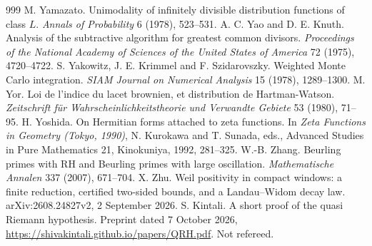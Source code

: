 \begin{thebibliography}{999}
 M. Yamazato. Unimodality of infinitely divisible distribution functions of class $L$. \emph{Annals of Probability} 6 (1978), 523--531.
 A. C. Yao and D. E. Knuth. Analysis of the subtractive algorithm for greatest common divisors. \emph{Proceedings of the National Academy of Sciences of the United States of America} 72 (1975), 4720--4722.
 S. Yakowitz, J. E. Krimmel and F. Szidarovszky. Weighted Monte Carlo integration. \emph{SIAM Journal on Numerical Analysis} 15 (1978), 1289--1300.
 M. Yor. Loi de l'indice du lacet brownien, et distribution de Hartman-Watson. \emph{Zeitschrift f\"ur Wahrscheinlichkeitstheorie und Verwandte Gebiete} 53 (1980), 71--95.
 H. Yoshida. On Hermitian forms attached to zeta functions. In \emph{Zeta Functions in Geometry (Tokyo, 1990)}, N. Kurokawa and T. Sunada, eds., Advanced Studies in Pure Mathematics 21, Kinokuniya, 1992, 281--325.
 W.-B. Zhang. Beurling primes with RH and Beurling primes with large oscillation. \emph{Mathematische Annalen} 337 (2007), 671--704.
 X. Zhu. Weil positivity in compact windows: a finite reduction, certified two-sided bounds, and a Landau--Widom decay law. arXiv:2608.24827v2, 2 September 2026.
 S. Kintali. A short proof of the quasi Riemann hypothesis. Preprint dated 7 October 2026, \url{https://shivakintali.github.io/papers/QRH.pdf}. Not refereed. %

\end{thebibliography}
